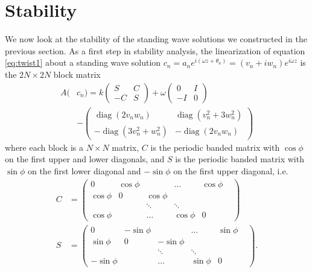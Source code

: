 \documentclass[reprint, amsmath,amssymb,aps,pra]{revtex4-2}
\DeclareMathOperator{\diag}{diag}
\begin{document}
\section{Stability}\label{sec:stability}

We now look at the stability of the standing wave solutions we constructed in the previous section. As a first step in stability analysis, the linearization of equation \cref{eq:twist1} about a standing wave solution $c_n = a_n e^{i (\omega z + \theta_n) } = (v_n + i w_n)e^{i\omega z}$ is the $2N \times 2N$ block matrix
\begin{equation}\label{eq:linearization}
\begin{aligned}
A(&c_n) =
k \begin{pmatrix}S & C \\ -C & S \end{pmatrix}
+ \omega\begin{pmatrix}0 & I \\ -I & 0 \end{pmatrix} \\
&-\begin{pmatrix} \diag(2v_n w_n) & \diag(v_n^2 + 3 w_n^2) \\
-\diag(3 v_n^2 + w_n^2) & -\diag(2v_n w_n) \end{pmatrix}
\end{aligned}
\end{equation}
where each block is a $N\times N$ matrix, $C$ is the periodic banded matrix with $\cos \phi$ on the first upper and lower diagonals, and $S$ is the periodic banded matrix with $\sin \phi$ on the first lower diagonal and $-\sin \phi$ on the first upper diagonal, i.e.
\begin{align*}
C &= \begin{pmatrix}
0 & \cos \phi & & \dots & \cos \phi \\
\cos \phi & 0 & \cos \phi & & & \\
& & \ddots & \ddots &  & \\
\cos \phi & & \dots & \cos \phi & 0
\end{pmatrix} \\
S &= \begin{pmatrix}
0 & -\sin \phi & & \dots & \sin \phi \\
\sin \phi & 0 & -\sin \phi & & & \\
& & \ddots & \ddots &  & \\
-\sin \phi & & \dots & \sin \phi & 0
\end{pmatrix}.
\end{align*}
\end{document}
